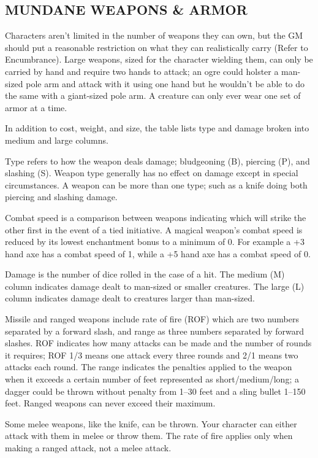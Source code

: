 \begin{multicols}{2}
\section{MUNDANE WEAPONS \& ARMOR}

Characters aren't limited in the number of weapons they can own, but the GM should put a reasonable restriction on what they can realistically carry (Refer to Encumbrance).  Large weapons, sized for the character wielding them, can only be carried by hand and require two hands to attack; an ogre could holster a man-sized pole arm and attack with it using one hand but he wouldn't be able to do the same with a giant-sized pole arm.  A creature can only ever wear one set of armor at a time.

In addition to cost, weight, and size, the table lists type and damage broken into medium and large columns.  

Type refers to how the weapon deals damage; bludgeoning (B), piercing (P), and slashing (S).  Weapon type generally has no effect on damage except in special circumstances.  A weapon can be more than one type; such as a knife doing both piercing and slashing damage.  

Combat speed is a comparison between weapons indicating which will strike the other first in the event of a tied initiative.  A magical weapon's combat speed is reduced by its lowest enchantment bonus to a minimum of 0.  For example a +3 hand axe has a combat speed of 1, while a +5 hand axe has a combat speed of 0.

Damage is the number of dice rolled in the case of a hit.  The medium (M) column indicates damage dealt to man-sized or smaller creatures.  The large (L) column indicates damage dealt to creatures larger than man-sized.

Missile and ranged weapons include rate of fire (ROF) which are two numbers separated by a forward slash, and range as three numbers separated by forward slashes.  ROF indicates how many attacks can be made and the number of rounds it requires; ROF 1/3 means one attack every three rounds and 2/1 means two attacks each round.  The range indicates the penalties applied to the weapon when it exceeds a certain number of feet represented as short/medium/long; a dagger could be thrown without penalty from 1--30 feet and a sling bullet 1--150 feet.  Ranged weapons can never exceed their maximum.

Some melee weapons, like the knife, can be thrown.  Your character can either attack with them in melee or throw them.  The rate of fire applies only when making a ranged attack, not a melee attack.  


\end{multicols}
